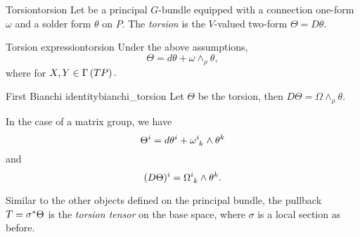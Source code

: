 \begin{definition}{Torsion}{torsion}
    Let  be a principal \(G\)-bundle equipped with a connection one-form \(\omega\) and a solder form \(\theta\) on \(P\). The \emph{torsion} is the \(V\)-valued two-form \(\Theta = D\theta\).
\end{definition}
\begin{proposition}{Torsion expression}{torsion}
    Under the above assumptions,
    \begin{equation*}
        \Theta = d\theta + \omega \wedge_\rho \theta,
    \end{equation*}
    where \todo[
    \begin{equation*}
        (\omega \wedge_\rho \theta)(X,Y) = \left(\pf{\rho}{\omega(X)}\right) \lact \theta(Y)
    \end{equation*}]
    for \(X,Y \in \Gamma\left(TP\right).\)
\end{proposition}

\begin{theorem}{First Bianchi identity}{bianchi_torsion}
    Let \(\Theta\) be the torsion, then \(D\Theta = \Omega \wedge_{\rho} \theta\).
\end{theorem}
\begin{remark}
    In the case of a matrix group, we have
    \begin{equation*}
        \Theta^i = d\theta^i + \omega\indices{^i_k}\wedge \theta^k
    \end{equation*}
    and
    \begin{equation*}
        (D\Theta)^i = \Omega\indices{^i_k} \wedge \theta^k.
    \end{equation*}
\end{remark}

Similar to the other objects defined on the principal bundle, the pullback \(T = {\sigma}^{\ast}_{}{\Theta}\) is the \emph{torsion tensor} on the base space, where \(\sigma\) is a local section as before.
